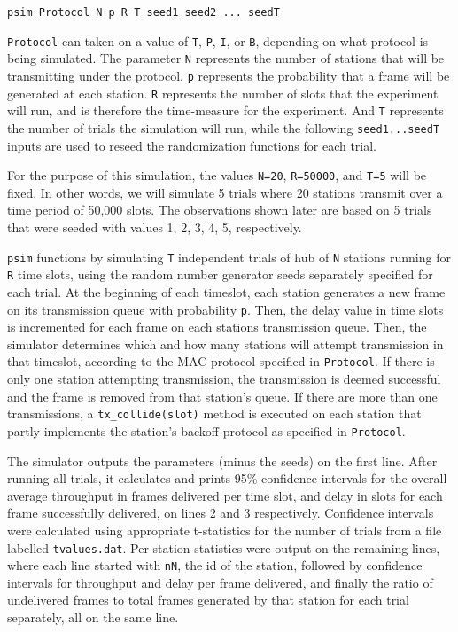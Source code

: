 \documentclass[twocolumn]{article}
\begin{document}
\begin{center}\verb|psim Protocol N p R T seed1 seed2 ... seedT|\end{center}

 \verb|Protocol| can taken on a value of \verb|T|, \verb|P|, \verb|I|, or \verb|B|, depending on
what protocol is being simulated. The parameter \verb|N| represents the number of
stations that will be transmitting under the protocol. \verb|p| represents the
probability that a frame will be generated at each station. \verb|R| represents the
number of slots that the experiment will run, and is therefore the time-measure
for the experiment. And \verb|T| represents the number of trials the simulation will
run, while the following \verb|seed1...seedT| inputs are used to reseed the
randomization functions for each trial. 

For the purpose of this simulation, the
values \verb|N=20|, \verb|R=50000|, and \verb|T=5| will be fixed. In other words, we will
simulate 5 trials where 20 stations transmit over a time period of 50,000 slots.
The observations shown later are based on 5 trials that were seeded with values
1, 2, 3, 4, 5, respectively.

\verb|psim| functions by simulating \verb|T| independent trials of hub of
\verb|N| stations running for \verb|R| time slots, using the random number
generator seeds separately specified for each trial. At the beginning of each
timeslot, each station generates a new frame on its transmission queue with
probability \verb|p|. Then, the delay value in time slots is incremented for
each frame on each stations transmission queue.  Then, the simulator determines
which and how many stations will attempt transmission in that timeslot,
according to the MAC protocol specified in \verb|Protocol|. If there is only one
station attempting transmission, the transmission is deemed successful and the
frame is removed from that station's queue. If there are more than one
transmissions, a \verb|tx_collide(slot)| method is executed on each station that
partly implements the station's backoff protocol as specified in
\verb|Protocol|.

The simulator outputs the parameters (minus the seeds) on the first line. After
running all trials, it calculates and prints 95\% confidence intervals for the
overall average throughput in frames delivered per time slot, and delay in slots
for each frame successfully delivered, on lines 2 and 3 respectively. Confidence
intervals were calculated using appropriate t-statistics for the number of
trials from a file labelled \verb|tvalues.dat|. Per-station statistics were output
on the remaining lines, where each line started with \verb|nN|, the id of the station,
followed by confidence intervals for throughput and delay per frame delivered, and finally
the ratio of undelivered frames to total frames generated by that station for each trial 
separately, all on the same line.
\end{document}
